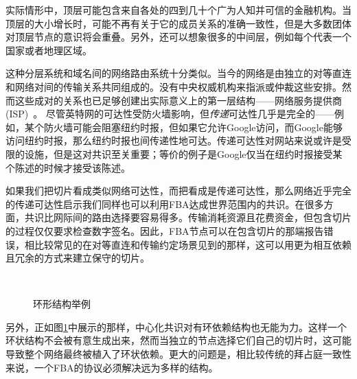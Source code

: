 实际情形中，顶层可能包含来自各处的四到几十个广为人知并可信的金融机构。当顶层的大小增长时，可能不再有关于它的成员关系的准确一致性，但是大多数团体对顶层节点的意识将会重叠。另外，还可以想象很多的中间层，例如每个代表一个国家或者地理区域。

这种分层系统和域名间的网络路由系统十分类似。当今的网络是由独立的对等直连和网络对间的传输关系共同组成的。没有中央权威机构来指派或仲裁这些安排。然而这些成对的关系也已足够创建出实际意义上的第一层结构——网络服务提供商(ISP)~。	尽管英特网的可达性受防火墙影响，但\textit{传递}可达性几乎是完全的——例如，某个防火墙可能会阻塞纽约时报，但如果它允许Google访问，而Google能够访问纽约时报，那么纽约时报也间传递性地可达。传递可达性对网站来说或许是受限的设施，但是这对共识至关重要；等价的例子是Google仅当在纽约时报接受某个陈述的时候才接受该陈述。

如果我们把{\quorum}切片看成类似网络可达性，而把{\quorum}看成是传递可达性，那么网络近乎完全的传递可达性启示我们同样也可以利用FBA达成世界范围内的共识。在很多方面，共识比网际间的路由选择要容易得多。传输消耗资源且花费资金，但包含切片的过程仅仅要求检查数字签名。因此，FBA节点可以在包含切片的那端报告错误，相比较常见的在对等直连和传输约定场景见到的那样，这可以用更为相互依赖且冗余的方式来建立保守的切片。


\begin{figure}
\centering
{}\\
\caption{环形{\quorum}结构举例}
\label{fig:cycle}
\end{figure}

另外，正如图\ref{fig:cycle}中展示的那样，中心化共识对有环依赖结构也无能为力。这样一个环状结构不会被有意生成出来，然而当独立的节点选择它们自己的切片时，这可能导致整个网络最终被植入了环状依赖。更大的问题是，相比较传统的拜占庭一致性来说，一个FBA的协议必须解决远为多样的{\quorum}结构。